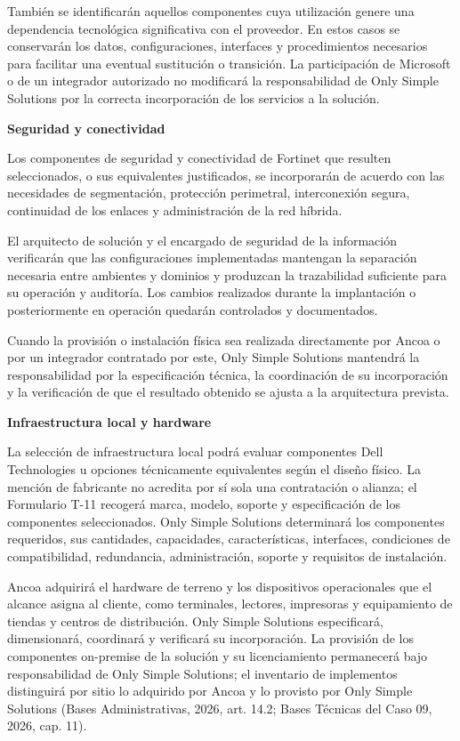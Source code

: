 \documentclass[11pt]{article}
\begin{document}
También se identificarán aquellos componentes cuya utilización genere
una dependencia tecnológica significativa con el proveedor. En estos
casos se conservarán los datos, configuraciones, interfaces y
procedimientos necesarios para facilitar una eventual sustitución o
transición. La participación de Microsoft o de un integrador autorizado
no modificará la responsabilidad de Only Simple Solutions por la
correcta incorporación de los servicios a la solución.

\textbf{Seguridad y conectividad}

Los componentes de seguridad y conectividad de Fortinet que resulten
seleccionados, o sus equivalentes justificados, se incorporarán de
acuerdo con las necesidades de segmentación, protección perimetral,
interconexión segura, continuidad de los enlaces y administración de la
red híbrida.

El arquitecto de solución y el encargado de seguridad de la información
verificarán que las configuraciones implementadas mantengan la
separación necesaria entre ambientes y dominios y produzcan la
trazabilidad suficiente para su operación y auditoría. Los cambios
realizados durante la implantación o posteriormente en operación
quedarán controlados y documentados.

Cuando la provisión o instalación física sea realizada directamente por
Ancoa o por un integrador contratado por este, Only Simple Solutions
mantendrá la responsabilidad por la especificación técnica, la
coordinación de su incorporación y la verificación de que el resultado
obtenido se ajusta a la arquitectura prevista.

\textbf{Infraestructura local y hardware}

La selección de infraestructura local podrá evaluar componentes Dell
Technologies u opciones técnicamente equivalentes según el diseño
físico. La mención de fabricante no acredita por sí sola una
contratación o alianza; el Formulario T-11 recogerá marca, modelo,
soporte y especificación de los componentes seleccionados. Only Simple
Solutions determinará los componentes requeridos, sus cantidades,
capacidades, características, interfaces, condiciones de compatibilidad,
redundancia, administración, soporte y requisitos de instalación.

Ancoa adquirirá el hardware de terreno y los dispositivos operacionales
que el alcance asigna al cliente, como terminales, lectores, impresoras
y equipamiento de tiendas y centros de distribución. Only Simple
Solutions especificará, dimensionará, coordinará y verificará su
incorporación. La provisión de los componentes on-premise de la solución
y su licenciamiento permanecerá bajo responsabilidad de Only Simple
Solutions; el inventario de implementos distinguirá por sitio lo
  adquirido por Ancoa y lo provisto por Only Simple Solutions (Bases
  Administrativas, 2026, art. 14.2; Bases Técnicas del Caso 09, 2026,
  cap. 11).
\end{document}
